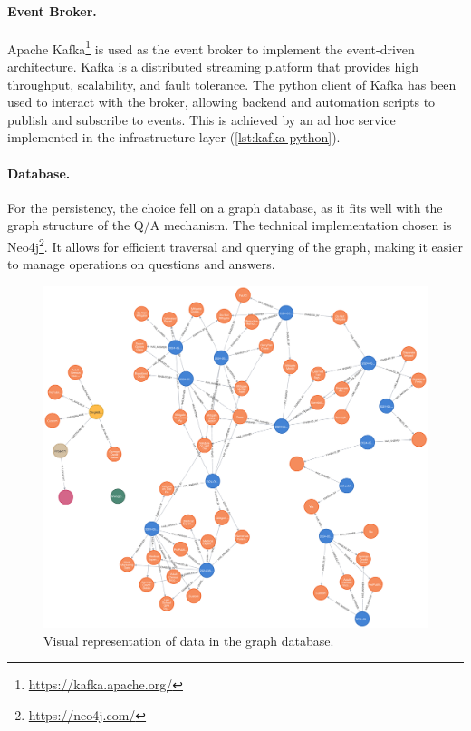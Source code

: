 \documentclass[12pt,a4paper,openright,twoside]{book}
\begin{document}
\paragraph{Event Broker.}

Apache Kafka\footnote{\href{https://kafka.apache.org/}{https://kafka.apache.org/}} is used as the event broker to implement the event-driven architecture.
%
Kafka is a distributed streaming platform that provides high throughput, scalability, and fault tolerance.
%
The python client of Kafka has been used to interact with the broker, allowing backend and automation scripts to publish and subscribe to events.
%
This is achieved by an ad hoc service implemented in the infrastructure layer (\cref{lst:kafka-python}).





\paragraph{Database.}

For the persistency, the choice fell on a graph database, as it fits well with the graph structure of the \ac{Q/A} mechanism. The technical implementation chosen is Neo4j\footnote{\href{https://neo4j.com/}{https://neo4j.com/}}.
%
It allows for efficient traversal and querying of the graph, making it easier to manage operations on questions and answers.


\begin{figure}
    \centering
    \includegraphics[width=0.72\linewidth]{figures/graph-db.png}
    \caption{
        Visual representation of data in the graph database.
    }
    \label{fig:graph-db}
\end{figure}
\end{document}
